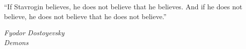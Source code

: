 


\epigraph{“If Stavrogin believes, he does not believe that he believes. And if he does not believe, he does not believe that he does not believe.” }{\textit{Fyodor Dostoyevsky \\ Demons }}